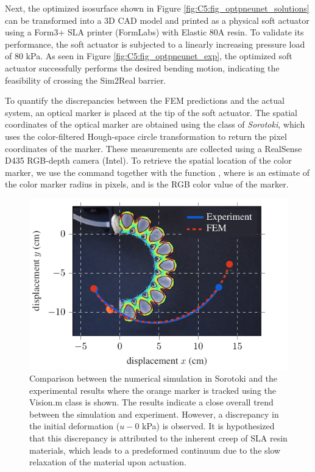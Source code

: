 Next, the optimized isosurface shown in Figure \ref{fig:C5:fig_optpneunet_solutions} can be transformed into a 3D CAD model and printed as a physical soft actuator using a Form3+ SLA printer (FormLabs) with Elastic 80A resin. To validate its performance, the soft actuator is subjected to a linearly increasing pressure load of 80 \si{\kilo \pascal}. As seen in Figure \ref{fig:C5:fig_optpneunet_exp}, the optimized soft actuator successfully performs the desired bending motion, indicating the feasibility of crossing the Sim2Real barrier.

To quantify the discrepancies between the FEM predictions and the actual system, an optical marker is placed at the tip of the soft actuator. The spatial coordinates of the optical marker are obtained using the  class of \textit{Sorotoki}, which uses the color-filtered Hough-space circle transformation to return the pixel coordinates of the marker. These measurements are collected using a RealSense D435 RGB-depth camera (Intel). To retrieve the spatial location of the color marker, we use the command  together with the function , where  is an estimate of the color marker radius in pixels, and  is the RGB color value of the marker.

\begin{figure}[!t]
    \centering
    \includegraphics*[width=.8\textwidth]{./pdf/thesis-figure-6-25.pdf}
    \caption{Comparison between the numerical simulation in Sorotoki and the experimental results where the orange marker is tracked using the Vision.m class is shown. The results indicate a close overall trend between the simulation and experiment. However, a discrepancy in the initial deformation ($u - 0$ kPa) is observed. It is hypothesized that this discrepancy is attributed to the inherent creep of SLA resin materials, which leads to a predeformed continuum due to the slow relaxation of the material upon actuation.}
    \label{fig:C5:fig_optpneunet_exp_compare}
\end{figure}

